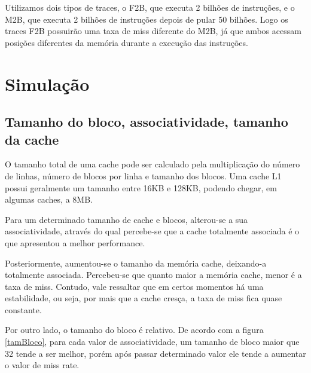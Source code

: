 \documentclass[12pt,a4paper]{article}
\begin{document}
Utilizamos dois tipos de traces, o F2B, que executa 2 bilhões de
instruções, e o M2B, que executa 2 bilhões de instruções depois de pular
50 bilhões. Logo os traces F2B possuirão uma taxa de miss diferente do M2B, já que ambos
acessam posições diferentes da memória durante a execução das instruções. 


\section{Simulação}

\subsection{Tamanho do bloco, associatividade, tamanho da cache}
\label{sec1}
O tamanho total de uma cache pode ser calculado pela multiplicação do
número de linhas, número de blocos por linha e tamanho dos blocos.
Uma cache L1 possui geralmente um tamanho entre 16KB e 128KB, podendo chegar, em algumas caches, a 8MB.

Para um determinado tamanho de cache e blocos, alterou-se a sua
associatividade, através do qual percebe-se que a cache totalmente associada é o que
apresentou a melhor performance.

Posteriormente, aumentou-se o tamanho da memória cache, deixando-a totalmente associada.
Percebeu-se que quanto maior a memória cache, menor é a taxa de miss. Contudo, vale ressaltar que
em certos momentos há uma estabilidade, ou seja, por mais que a cache cresça, a taxa de miss fica quase
constante.

Por outro lado, o tamanho do bloco é relativo. De acordo com a figura \ref{tamBloco}, para cada valor de associatividade, um tamanho de bloco maior que 32
tende a ser melhor, porém após passar determinado valor ele tende a aumentar o valor de miss rate.
\end{document}
